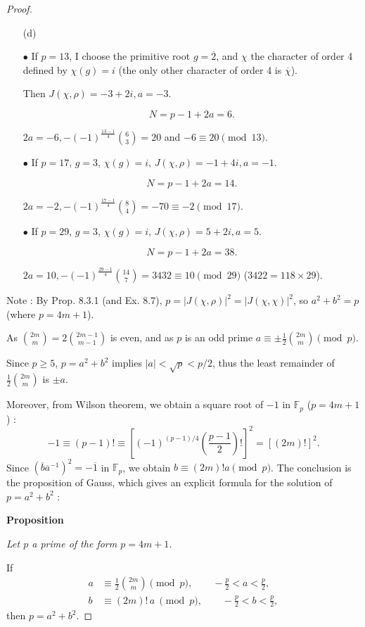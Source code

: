 \documentclass[11pt,a4paper]{article}
\newcommand{\F}{\mathbb{F}}
\begin{document}
{\begin{proof}
\begin{enumerate}
$$2a \equiv - (-1)^{\frac{p-1}{4}}\binom{\frac{p-1}{2}}{\frac{p-1}{4}}\ \pmod p.$$


\item[(d)] 

 $\bullet$ If $p=13$, I choose the primitive root $g = \overline{2}$, and $\chi$ the character of order 4 defined by $\chi(g) = i$ (the only other character of order 4 is $\overline{\chi}$).
 
Then $J(\chi,\rho) = -3+2i, a = -3$.

$$N=p-1+2a=6.$$

$2a=-6, -(-1)^{\frac{13-1}{4}} \binom{6}{3} = 20$ and $-6\equiv20\pmod {13}$.

$\bullet$ If $p=17$, $g = 3$,  $\chi(g) = i$, $J(\chi,\rho) = -1+4i, a=-1$.

$$N = p-1+2a = 14.$$

$2a=-2, -(-1)^{\frac{17-1}{4}} \binom{8}{4} =-70 \equiv -2\pmod{17}$.

$\bullet$ If $p=29$, $g = 3$,  $\chi(g) = i$, $J(\chi,\rho) = 5+2i, a=5$.

$$N = p-1+2a = 38.$$

$2a=10, -(-1)^{\frac{29-1}{4}} \binom{14}{7} =3432 \equiv 10\pmod {29}$ ($3422 = 118\times 29$).

\end{enumerate}

\bigskip

Note : By Prop. 8.3.1 (and Ex. 8.7),  $ p = | J(\chi,\rho) |^2 = |J(\chi,\chi)|^2$, so $a^2 + b^2 = p$ (where $p = 4m+1$).

As $\binom{2m}{m} = 2 \binom{2m-1}{m-1}$ is even, and as $p$ is an odd prime $a \equiv \pm \frac{1}{2} \binom{2m}{m} \pmod p$.

Since $p\geq 5$, $p = a^2+b^2$ implies $|a| < \sqrt{p} < p/2$, thus the least remainder of $\frac{1}{2} \binom{2m}{m}$ is $\pm a$. 

Moreover, from Wilson theorem, we obtain a square root of $-1$ in $\F_p$ ($p = 4 m +1$) :
$$-1 \equiv (p-1)! \equiv \left[ (-1)^{(p-1)/4} \left( \frac{p-1}{2}\right)!\right]^2 = [(2m)!]^2.$$
Since $(\overline{b}\overline{a}^{-1})^2 = -\overline{1}$ in $\F_p$, we obtain $ b \equiv (2m)! a \pmod p$. The conclusion is the proposition of Gauss, which  gives an explicit formula for the solution of $p=a^2+b^2$ :

{\bf Proposition} {\it  Let $p$ a prime of the form $p=4m+1$.

If 
\begin{align*}
a &\equiv \frac{1}{2} \binom{2m}{m} \pmod p,\qquad -\frac{p}{2} < a < \frac{p}{2},\\
b &\equiv (2m)!\, a\ \pmod p,\qquad  -\frac{p}{2} < b < \frac{p}{2},
\end{align*}
then $p = a^2+b^2$.
}
\end{proof}

}
\end{document}
